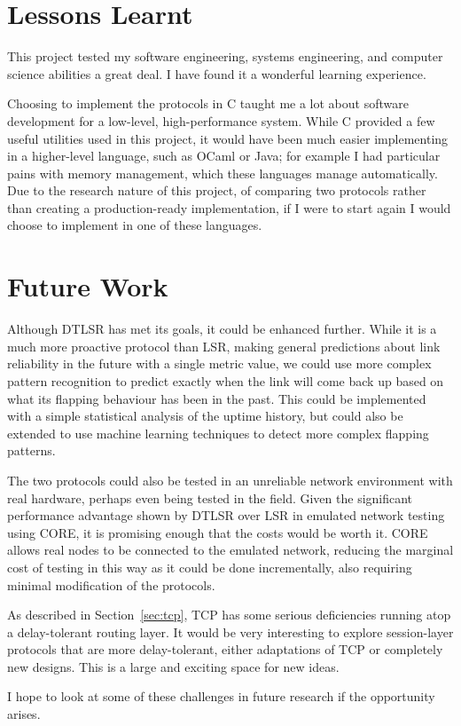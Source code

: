 \documentclass[withindex,glossary,openany]{cam-thesis}
\begin{document}
\section{Lessons Learnt}

This project tested my software engineering, systems engineering, and computer science abilities a great deal. I have found it a wonderful learning experience.

Choosing to implement the protocols in C taught me a lot about software development for a low-level, high-performance system. While C provided a few useful utilities used in this project, it would have been much easier implementing in a higher-level language, such as OCaml or Java; for example I had particular pains with memory management, which these languages manage automatically. Due to the research nature of this project, of comparing two protocols rather than creating a production-ready implementation, if I were to start again I would choose to implement in one of these languages.

\section{Future Work}

Although DTLSR has met its goals, it could be enhanced further. While it is a much more proactive protocol than LSR, making general predictions about link reliability in the future with a single metric value, we could use more complex pattern recognition to predict exactly when the link will come back up based on what its flapping behaviour has been in the past. This could be implemented with a simple statistical analysis of the uptime history, but could also be extended to use machine learning techniques to detect more complex flapping patterns.

The two protocols could also be tested in an unreliable network environment with real hardware, perhaps even being tested in the field. Given the significant performance advantage shown by DTLSR over LSR in emulated network testing using CORE, it is promising enough that the costs would be worth it. CORE allows real nodes to be connected to the emulated network, reducing the marginal cost of testing in this way as it could be done incrementally, also requiring minimal modification of the protocols.

As described in Section~\ref{sec:tcp}, TCP has some serious deficiencies running atop a delay-tolerant routing layer. It would be very interesting to explore session-layer protocols that are more delay-tolerant, either adaptations of TCP or completely new designs. This is a large and exciting space for new ideas.

I hope to look at some of these challenges in future research if the opportunity arises.











\end{document}

